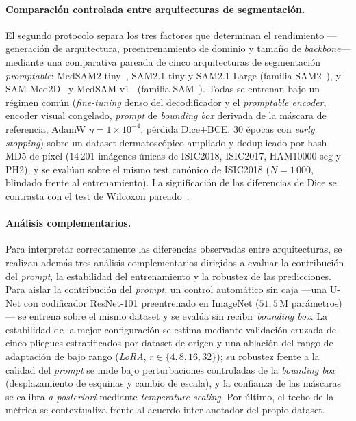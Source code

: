 \paragraph{Comparación controlada entre arquitecturas de
segmentación.}
El segundo protocolo separa los tres factores que determinan el
rendimiento ---generación de arquitectura, preentrenamiento de
dominio y tamaño de \emph{backbone}--- mediante una comparativa
pareada de cinco arquitecturas de segmentación \emph{promptable}:
MedSAM2-tiny~\cite{medsam2}, SAM2.1-tiny y SAM2.1-Large (familia
SAM2~\cite{sam2}), y SAM-Med2D~\cite{sammed2d} y MedSAM
v1~\cite{medsam} (familia SAM~\cite{sam2023}). Todas se entrenan
bajo un régimen común (\emph{fine-tuning} denso del decodificador y
el \emph{promptable encoder}, encoder visual congelado, \emph{prompt}
de \emph{bounding box} derivada de la máscara de referencia, AdamW
$\eta = 1\times 10^{-4}$, pérdida Dice$+$BCE, $30$ épocas con
\emph{early stopping}) sobre un dataset dermatoscópico ampliado y
deduplicado por hash MD5 de píxel ($14\,201$ imágenes únicas de
ISIC2018, ISIC2017, HAM10000-seg y PH2), y se evalúan sobre el mismo
test canónico de ISIC2018 ($N = 1\,000$, blindado frente al
entrenamiento). La significación de las diferencias de Dice se
contrasta con el test de Wilcoxon pareado~\cite{wilcoxon1945}.

\paragraph{Análisis complementarios.}
Para interpretar correctamente las diferencias observadas entre
arquitecturas, se realizan además tres análisis complementarios
dirigidos a evaluar la contribución del \emph{prompt}, la
estabilidad del entrenamiento y la robustez de las predicciones.
Para aislar la contribución del \emph{prompt}, un
control automático sin caja ---una U-Net con codificador ResNet-101
preentrenado en ImageNet ($51{,}5$\,M parámetros)--- se entrena
sobre el mismo dataset y se evalúa sin recibir \emph{bounding box}.
La estabilidad de la mejor configuración se estima mediante
validación cruzada de cinco pliegues estratificados por dataset de
origen y una ablación del rango de adaptación de bajo rango
(\emph{LoRA}, $r\in\{4,8,16,32\}$); su robustez frente a la calidad
del \emph{prompt} se mide bajo perturbaciones controladas de la
\emph{bounding box} (desplazamiento de esquinas y cambio de escala),
y la confianza de las máscaras se calibra \emph{a posteriori}
mediante \emph{temperature scaling}. Por último, el techo de la
métrica se contextualiza frente al acuerdo inter-anotador del propio
dataset.

